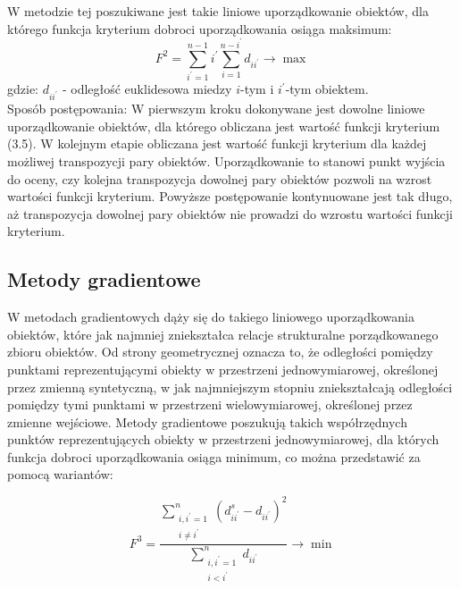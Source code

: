 \documentclass[12pt,a4paper]{report}
\begin{document}
W metodzie tej poszukiwane jest  takie liniowe uporządkowanie obiektów, dla którego funkcja kryterium dobroci uporządkowania osiąga maksimum:
\begin{equation}
F^{2}=\sum_{i^{'}=1}^{n-1} i^{'}\sum_{i=1}^{n-i^{'}} d_{ii^{'}} \rightarrow     \max  
\end{equation}
gdzie:
\newline
$d_{ii^{'}}$ - odległość euklidesowa miedzy $i$-tym i $i^{'}$-tym obiektem.\\
Sposób postępowania:
\newline
W pierwszym kroku dokonywane jest dowolne liniowe uporządkowanie obiektów, dla którego obliczana jest wartość funkcji kryterium (3.5). W kolejnym etapie obliczana jest wartość funkcji kryterium dla każdej możliwej transpozycji pary obiektów.
Uporządkowanie to stanowi punkt wyjścia do oceny, czy kolejna transpozycja dowolnej pary obiektów pozwoli na wzrost wartości funkcji kryterium. Powyższe postępowanie kontynuowane jest tak długo, aż transpozycja dowolnej pary obiektów nie prowadzi do wzrostu wartości funkcji kryterium. 


\subsection{Metody gradientowe} %
\noindent

W metodach gradientowych dąży się do takiego liniowego uporządkowania obiektów, które jak najmniej zniekształca relacje strukturalne porządkowanego zbioru obiektów. Od strony geometrycznej oznacza to, że odległości pomiędzy punktami reprezentującymi obiekty w przestrzeni jednowymiarowej, określonej przez zmienną syntetyczną, w jak najmniejszym stopniu zniekształcają odległości pomiędzy tymi punktami w przestrzeni wielowymiarowej, określonej przez zmienne wejściowe. Metody gradientowe poszukują takich współrzędnych punktów reprezentujących obiekty w przestrzeni jednowymiarowej, dla których funkcja dobroci uporządkowania osiąga minimum, co można przedstawić za pomocą wariantów:
 
\begin{equation}
F^{3}=\frac{\sum\limits_{\substack{i,i^{'}=1\\ i \neq i^{'}}}^n (d_{ii^{'}}^{s} - d_{ii^{'}})^2 }{\sum\limits_{\substack{i,i^{'}=1 \\ i<i^{'}}}^{n} d_{ii^{'}} } \rightarrow     \min  
\end{equation}
\end{document}
